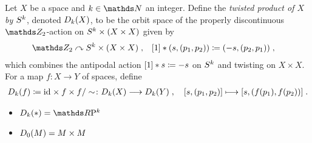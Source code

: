 \begin{Def}
  Let $X$ be a space and $k\in\Nat$ an integer.
  Define the \emph{twisted product of $X$ by $S^{k}$}, denoted
  $D_{k}({X})$, to be the orbit space of the properly
  discontinuous $\Zmod2$-action on $S^{k}\times(X\times X)$ given
  by
  \begin{align*}
    \Zmod2 &\leftgroupaction \Twistedprodcovspace{k}{X}
             \;,
    &[1] \actson (s, (p_1,p_2)) &\coloneqq (-s, (p_2, p_1))
                                \;,
  \end{align*}
  which combines the antipodal action $[1]\ast s\coloneqq -s$ on
  $S^{k}$ and twisting on $X\times X$.
  For a map $f\colon X\to Y$ of spaces, define
  \begin{gather*}
    D_{k}({f})\coloneqq \mathrm{id}_{}\times f\times f/\sim \colon
    D_{k}({X})\longrightarrow D_{k}({Y})
    \;,\quad
    [s,(p_1,p_2)] \longmapsto [s,(f(p_1),f(p_2))]
    \;.
  \end{gather*}
\end{Def}
\begin{Ex}
  \begin{itemize}
  \item $\Twistedprod k {\pt} = \RP k$
  \item $D_{0}({M}) = M\times M$
  \end{itemize}
\end{Ex}

